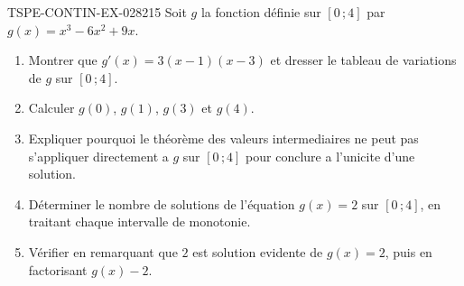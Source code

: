 \begin{exercice}{TSPE-CONTIN-EX-028}{2}{15}
Soit $g$ la fonction définie sur $[0\,;4]$ par $g(x) = x^3 - 6x^2 + 9x$.
\begin{enumerate}
  \item Montrer que $g'(x) = 3(x-1)(x-3)$ et dresser le tableau de variations de $g$ sur $[0\,;4]$.
  \item Calculer $g(0)$, $g(1)$, $g(3)$ et $g(4)$.
  \item Expliquer pourquoi le théorème des valeurs intermediaires ne peut pas s'appliquer directement a $g$ sur $[0\,;4]$ pour conclure a l'unicite d'une solution.
  \item Déterminer le nombre de solutions de l'équation $g(x) = 2$ sur $[0\,;4]$, en traitant chaque intervalle de monotonie.
  \item Vérifier en remarquant que $2$ est solution evidente de $g(x) = 2$, puis en factorisant $g(x) - 2$.
\end{enumerate}
\end{exercice}
